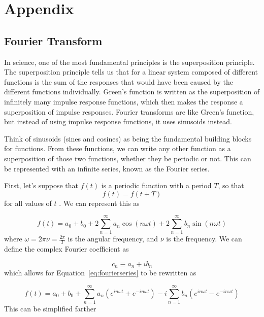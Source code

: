 %
%

\chapter{Appendix} \label{chap:Appendix}

\section{Fourier Transform}

In science, one of the most fundamental principles is the superposition
principle. The superposition principle tells us that for a linear system
composed of different functions is the sum of the responses that would have
been caused by the different functions individually. Green's function is
written as the
superposition of infinitely many impulse response functions, which then makes
the response a superposition of impulse responses. Fourier transforms are like
Green's function, but instead of using impulse response functions, it uses
sinusoids instead.

Think of sinusoids (sines and cosines) as being the fundamental building blocks
for functions. From these functions, we can write any other function as a
superposition of those two functions, whether they be periodic or not. This can
be represented with an infinite series, known as the Fourier series.

First, let's suppose that $f(t)$ is a periodic function with a period
$T$, so that
\begin{equation}
    f(t)=f(t+T)
\end{equation}
for all values of $t$ \cite{DanielSteck}. We can represent this as

\begin{equation}
    f(t) = a_0 + b_0 + 2\sum_{n=1}^{\infty} a_n \cos(n\omega
    t)+2\sum_{n=1}^{\infty}b_n\sin(n\omega t)
    \label{eq:fourierseries}
\end{equation}
where $\omega=2\pi\nu=\frac{2\pi}{T}$ is the angular frequency, and $\nu$ is the frequency.
We can define the complex Fourier coefficient as

\begin{equation}
    c_n \equiv a_n+ib_n
\end{equation}
which allows for Equation~\ref{eq:fourierseries} to be rewritten as

\begin{equation}
    f(t) = a_0 + b_0 +\sum_{n=1}^{\infty} a_n \left( e^{in\omega t} +
    e^{-in\omega t} \right) - i\sum_{n=1}^{\infty} b_n \left( e^{in\omega t} -
    e^{-in\omega t} \right)
\end{equation}
This can be simplified farther

